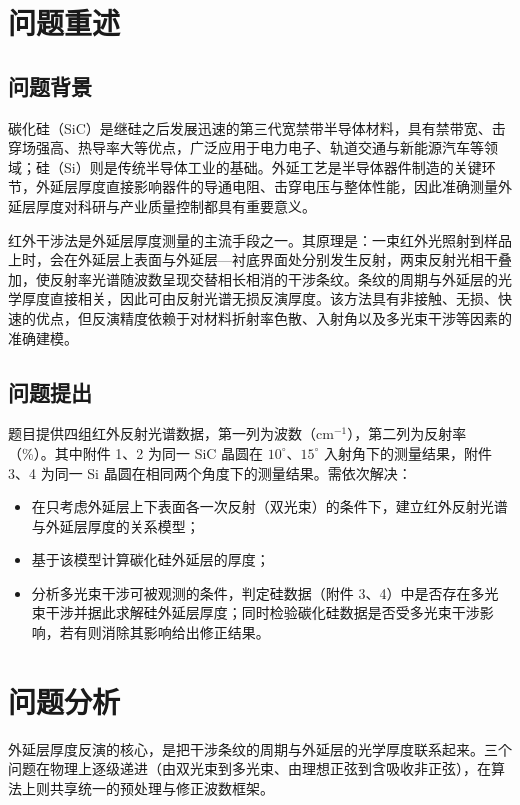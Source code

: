 \documentclass[withoutpreface,bwprint]{cumcmthesis}
\begin{document}
\section{问题重述}
\subsection{问题背景}
碳化硅（SiC）是继硅之后发展迅速的第三代宽禁带半导体材料，具有禁带宽、击穿场强高、热导率大等优点，广泛应用于电力电子、轨道交通与新能源汽车等领域；硅（Si）则是传统半导体工业的基础。外延工艺是半导体器件制造的关键环节，外延层厚度直接影响器件的导通电阻、击穿电压与整体性能，因此准确测量外延层厚度对科研与产业质量控制都具有重要意义。

红外干涉法是外延层厚度测量的主流手段之一。其原理是：一束红外光照射到样品上时，会在外延层上表面与外延层—衬底界面处分别发生反射，两束反射光相干叠加，使反射率光谱随波数呈现交替相长相消的干涉条纹。条纹的周期与外延层的光学厚度直接相关，因此可由反射光谱无损反演厚度。该方法具有非接触、无损、快速的优点，但反演精度依赖于对材料折射率色散、入射角以及多光束干涉等因素的准确建模。

\subsection{问题提出}
题目提供四组红外反射光谱数据，第一列为波数（$\mathrm{cm^{-1}}$），第二列为反射率（\%）。其中附件 1、2 为同一 SiC 晶圆在 $10^\circ$、$15^\circ$ 入射角下的测量结果，附件 3、4 为同一 Si 晶圆在相同两个角度下的测量结果。需依次解决：

\begin{itemize}
	\item[(1)] 在只考虑外延层上下表面各一次反射（双光束）的条件下，建立红外反射光谱与外延层厚度的关系模型；
	\item[(2)] 基于该模型计算碳化硅外延层的厚度；
	\item[(3)] 分析多光束干涉可被观测的条件，判定硅数据（附件 3、4）中是否存在多光束干涉并据此求解硅外延层厚度；同时检验碳化硅数据是否受多光束干涉影响，若有则消除其影响给出修正结果。
\end{itemize}

\section{问题分析}
外延层厚度反演的核心，是把干涉条纹的周期与外延层的光学厚度联系起来。三个问题在物理上逐级递进（由双光束到多光束、由理想正弦到含吸收非正弦），在算法上则共享统一的预处理与修正波数框架。
\end{document}
